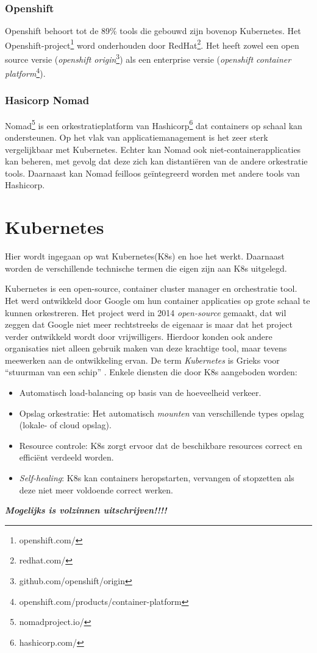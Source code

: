 \subsubsection{Openshift}
Openshift behoort tot de 89\% tools die gebouwd zijn bovenop Kubernetes. Het Openshift-project\footnote{openshift.com/} word onderhouden door RedHat\footnote{redhat.com/}. Het heeft zowel een open source versie (\textit{openshift origin}\footnote{github.com/openshift/origin}) als een enterprise versie (\textit{openshift container platform}\footnote{openshift.com/products/container-platform}).

\subsubsection{Hasicorp Nomad}
Nomad\footnote{nomadproject.io/} is een orkestratieplatform van Hashicorp\footnote{hashicorp.com/} dat containers op schaal kan ondersteunen. Op het vlak van applicatiemanagement is het zeer sterk vergelijkbaar met Kubernetes. Echter kan Nomad ook niet-containerapplicaties kan beheren, met gevolg dat deze zich kan distantiëren van de andere orkestratie tools. Daarnaast kan Nomad feilloos geïntegreerd worden met andere tools van Hashicorp.

\section{Kubernetes}
Hier wordt ingegaan op wat Kubernetes(K8s)  en hoe het werkt. Daarnaast worden de verschillende technische termen die eigen zijn aan K8s uitgelegd.

Kubernetes is een open-source, container cluster manager en orchestratie tool. Het werd ontwikkeld door Google om hun container applicaties op grote schaal te kunnen orkestreren. Het project werd in 2014 \textit{open-source} gemaakt, dat wil zeggen dat Google niet meer rechtstreeks de eigenaar is maar dat het project verder ontwikkeld wordt door vrijwilligers. Hierdoor konden ook andere organisaties niet alleen gebruik maken van deze krachtige tool, maar tevens meewerken aan de ontwikkeling ervan. De term \textit{Kubernetes} is Grieks voor ``stuurman van een schip'' \autocite{Kubernetes2021}. Enkele diensten die door K8s aangeboden worden:
\begin{itemize}
    \item Automatisch load-balancing op basis van de hoeveelheid verkeer.
    \item Opslag orkestratie: Het automatisch \textit{mounten} van verschillende types opslag (lokale- of cloud opslag).
    \item Resource controle: K8s zorgt ervoor dat de beschikbare resources correct en efficiënt verdeeld worden.
    \item \textit{Self-healing}: K8s kan containers heropstarten, vervangen of stopzetten als deze niet meer voldoende correct werken.
\end{itemize}
\textbf{\textit{Mogelijks is volzinnen uitschrijven!!!!}}

